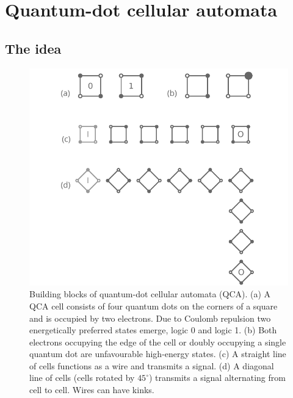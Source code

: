 \chapter{Quantum-dot cellular automata}
\graphicspath{{../gfx/chapter01/}}


\section{The idea}

\begin{figure}
  \center
  \includegraphics{intro_qca}
  \caption{
Building blocks of quantum-dot cellular automata (QCA). (a) A QCA cell consists
of four quantum dots on the corners of a square and is occupied by two
electrons. Due to Coulomb repulsion two energetically preferred states emerge,
logic 0 and logic 1. (b) Both electrons occupying the edge of the cell or
doubly occupying a single quantum dot are unfavourable high-energy states. (c) A
straight line of cells functions as a wire and transmits a signal.  (d) A
diagonal line of cells (cells rotated by $45^{\circ}$) transmits a signal
alternating from cell to cell. Wires can have kinks.
}
  \label{fig:intro_qca}
\end{figure}
%
